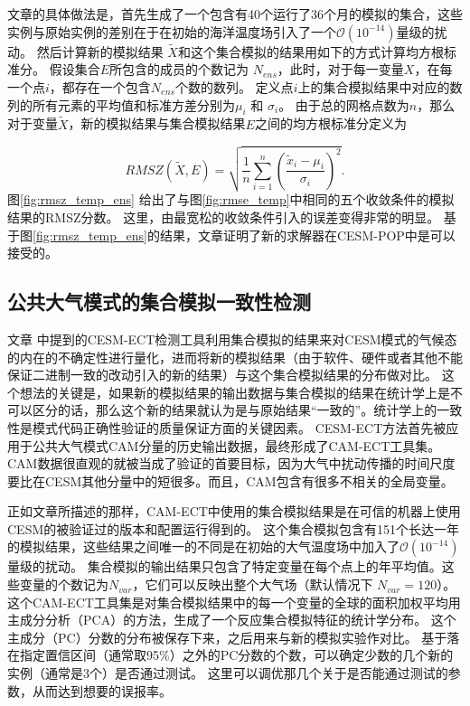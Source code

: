  
文章的具体做法是，首先生成了一个包含有40个运行了36个月的模拟的集合，这些实例与原始实例的差别在于在初始的海洋温度场引入了一个$\mathcal{O}(10^{-14})$量级的扰动。 
然后计算新的模拟结果 $\tilde{{X}}$和这个集合模拟的结果用如下的方式计算均方根标准分。 假设集合$E$所包含的成员的个数记为 $N_{ens}$，此时，对于每一变量$X$，在每一个点$i$，都存在一个包含$N_{ens}$个数的数列。
定义点$i$上的集合模拟结果中对应的数列的所有元素的平均值和标准方差分别为$\mu_i$ 和 $\sigma_i$。 
由于总的网格点数为$n$，那么对于变量$\tilde{{X}}$，新的模拟结果与集合模拟结果$E$之间的均方根标准分定义为

\begin{equation}
 RMSZ(\tilde{X}, E) = \sqrt{\frac{1}{n}\sum_{i=1}^n(\frac{\tilde{x}_i -\mu_i}{\sigma_i})^2}. 
\label{e:rmsz}
\end{equation}
图\ref{fig:rmsz_temp_ens} 给出了与图\ref{fig:rmse_temp}中相同的五个收敛条件的模拟结果的RMSZ分数。
这里，由最宽松的收敛条件引入的误差变得非常的明显。 
基于图\ref{fig:rmsz_temp_ens}的结果，文章证明了新的求解器在CESM-POP中是可以接受的。  


\subsection{公共大气模式的集合模拟一致性检测 }
\label{verify:CAM}
文章 中提到的CESM-ECT检测工具利用集合模拟的结果来对CESM模式的气候态的内在的不确定性进行量化，进而将新的模拟结果（由于软件、硬件或者其他不能保证二进制一致的改动引入的新的结果）与这个集合模拟结果的分布做对比。
这个想法的关键是，如果新的模拟结果的输出数据与集合模拟的结果在统计学上是不可以区分的话，那么这个新的结果就认为是与原始结果“一致的”。统计学上的一致性是模式代码正确性验证的质量保证方面的关键因素\cite{oberkampf2010}。
CESM-ECT方法首先被应用于公共大气模式CAM分量的历史输出数据，最终形成了CAM-ECT工具集。
CAM数据很直观的就被当成了验证的首要目标，因为大气中扰动传播的时间尺度要比在CESM其他分量中的短很多。而且，CAM包含有很多不相关的全局变量。 


 
正如文章\cite{baker2015}所描述的那样，CAM-ECT中使用的集合模拟结果是在可信的机器上使用CESM的被验证过的版本和配置运行得到的。 
这个集合模拟包含有151个长达一年的模拟结果，这些结果之间唯一的不同是在初始的大气温度场中加入了$\mathcal{O}(10^{-14})$ 量级的扰动。 
集合模拟的输出结果只包含了特定变量在每个点上的年平均值。这些变量的个数记为$N_{var}$，它们可以反映出整个大气场（默认情况下 $N_{var}=120$）。这个CAM-ECT工具集是对集合模拟结果中的每一个变量的全球的面积加权平均用主成分分析（PCA）的方法，生成了一个反应集合模拟特征的统计学分布。
这个主成分（PC）分数的分布被保存下来，之后用来与新的模拟实验作对比。 
基于落在指定置信区间（通常取95$\%$）之外的PC分数的个数，可以确定少数的几个新的实例（通常是3个）是否通过测试。 
这里可以调优那几个关于是否能通过测试的参数，从而达到想要的误报率。
 
